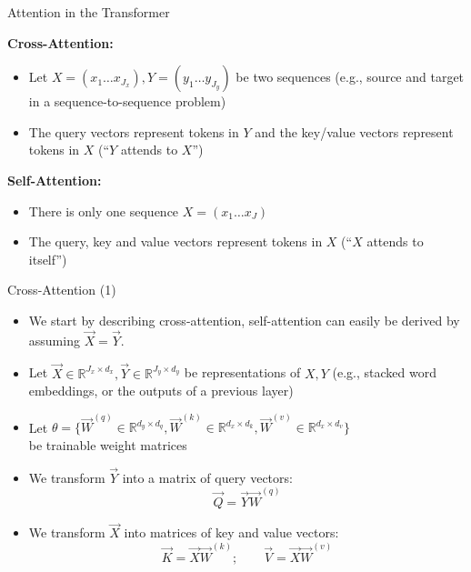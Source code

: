 \begin{vbframe}{Attention in the Transformer}

\vfill

\textbf{Cross-Attention:}
\begin{itemize}
\item Let $X = (x_1 \ldots x_{J_x}), Y = (y_1 \ldots y_{J_y})$ be two sequences (e.g., source and target in a sequence-to-sequence problem)
\item The query vectors represent tokens in $Y$ and the key/value vectors represent tokens in $X$ (``$Y$ attends to $X$'')
\end{itemize}

\medskip\medskip

\textbf{Self-Attention:}
\begin{itemize}
\item There is only one sequence $X = (x_1 \ldots x_J)$
\item The query, key and value vectors represent tokens in $X$ (``$X$ attends to itself'')
\end{itemize}

\vfill

\end{vbframe}

\begin{vbframe}{Cross-Attention (1)}

\vfill

\begin{itemize}
	\item We start by describing cross-attention, self-attention can easily be derived by assuming $\vec X = \vec Y$.
	\item Let $\vec X \in \mathbb{R}^{J_x \times d_x}, \vec Y \in \mathbb{R}^{J_y \times d_y}$ be representations of $X, Y$ (e.g., stacked word embeddings, or the outputs of a previous layer)
	\item Let $\theta = \{\vec W^{(q)} \in \mathbb{R}^{d_y \times d_q}, \vec W^{(k)} \in \mathbb{R}^{d_x \times d_k}, \vec W^{(v)} \in \mathbb{R}^{d_x \times d_v}\}$\\ be trainable weight matrices
	\item We transform $\vec Y$ into a matrix of query vectors:
	$$ \vec Q = \vec Y \vec W^{(q)} $$
	\item We transform $\vec X$ into matrices of key and value vectors:
	$$ \vec K = \vec X \vec W^{(k)} ; \qquad \vec V =  \vec X \vec W^{(v)}$$
\end{itemize}

\vfill

\end{vbframe}

